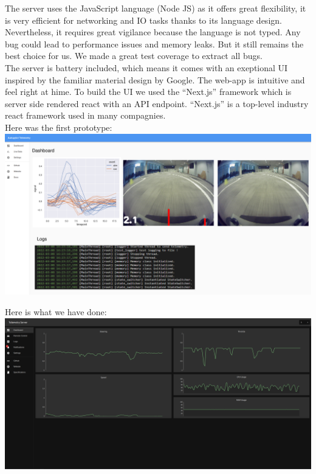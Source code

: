 \documentclass[12pt]{article}
\begin{document}
The server uses the JavaScript language (Node JS) as it offers great flexibility, it is very efficient for networking and IO tasks thanks to its language design. Nevertheless, it requires great vigilance because the language is not typed. Any bug could lead to performance issues and memory leaks. But it still remains the best choice for us. We made a great test coverage to extract all bugs.\\ 

The server is battery included, which means it comes with an exeptional UI inspired by the familiar material design by Google. The web-app is intuitive and feel right at hime. To build the UI we used the “Next.js” framework which is server side rendered react with an API endpoint. “Next.js” is a top-level industry react framework used in many compagnies.\\

\newpage  
Here was the first prototype:\\ 
\includegraphics[width=\textwidth]{../../docs/telemetry.png}

Here is what we have done:\\
\includegraphics[width=\textwidth]{../../docs/Telem1.png}\\
\end{document}
